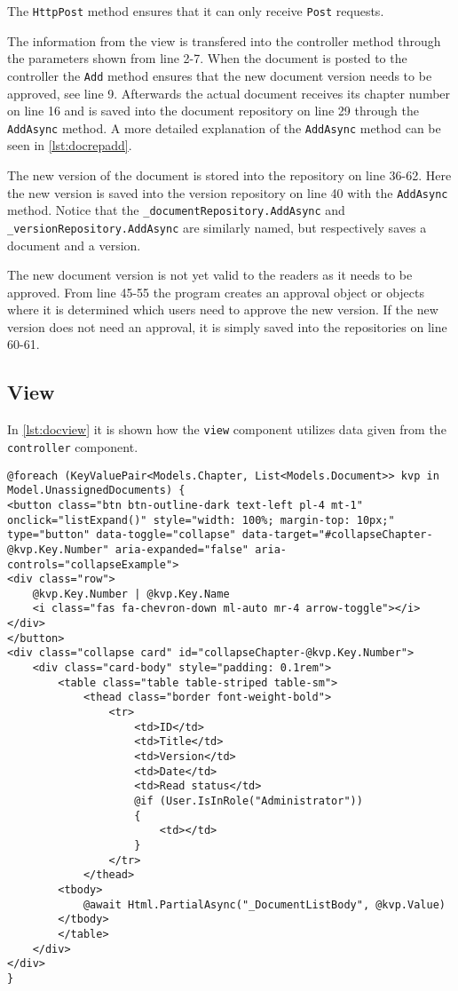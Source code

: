 The \texttt{HttpPost} method ensures that it can only receive \texttt{Post} requests.

The information from the view is transfered into the controller method through the parameters shown from line 2-7.
When the document is posted to the controller the \texttt{Add} method ensures that the new document version needs to be approved, see line 9.
Afterwards the actual document receives its chapter number on line 16 and is saved into the document repository on line 29 through the \texttt{AddAsync} method.
A more detailed explanation of the \texttt{AddAsync} method can be seen in \cref{lst:docrepadd}.

The new version of the document is stored into the repository on line 36-62.
Here the new version is saved into the version repository on line 40 with the \texttt{AddAsync} method.
Notice that the \texttt{_documentRepository.AddAsync} and \texttt{_versionRepository.AddAsync} are similarly named, but respectively saves a document and a version.

The new document version is not yet valid to the readers as it needs to be approved.
From line 45-55 the program creates an approval object or objects where it is determined which users need to approve the new version.
If the new version does not need an approval, it is simply saved into the repositories on line 60-61.

\subsection{View}

In \cref{lst:docview} it is shown how the \texttt{view} component utilizes data given from the \texttt{controller} component.

\begin{lstlisting}[caption={Document View: Index}, label={lst:docview}]
@foreach (KeyValuePair<Models.Chapter, List<Models.Document>> kvp in Model.UnassignedDocuments) {
<button class="btn btn-outline-dark text-left pl-4 mt-1" onclick="listExpand()" style="width: 100%; margin-top: 10px;" type="button" data-toggle="collapse" data-target="#collapseChapter-@kvp.Key.Number" aria-expanded="false" aria-controls="collapseExample">
<div class="row">
	@kvp.Key.Number | @kvp.Key.Name
	<i class="fas fa-chevron-down ml-auto mr-4 arrow-toggle"></i>
</div>
</button>
<div class="collapse card" id="collapseChapter-@kvp.Key.Number">
	<div class="card-body" style="padding: 0.1rem">
		<table class="table table-striped table-sm">
			<thead class="border font-weight-bold">
				<tr>
					<td>ID</td>
					<td>Title</td>
					<td>Version</td>
					<td>Date</td>
					<td>Read status</td>
					@if (User.IsInRole("Administrator"))
					{
						<td></td>
					}
				</tr>
			</thead>
		<tbody>
			@await Html.PartialAsync("_DocumentListBody", @kvp.Value)
		</tbody>
		</table>
	</div>
</div>
}

\end{lstlisting}


